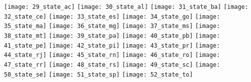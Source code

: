 \texttt{[image: 29\_state\_ac]}
\texttt{[image: 30\_state\_al]}
\texttt{[image: 31\_state\_ba]}
\texttt{[image: 32\_state\_ce]}
\texttt{[image: 33\_state\_es]}
\texttt{[image: 34\_state\_go]}
\texttt{[image: 35\_state\_ma]}
\texttt{[image: 36\_state\_mg]}
\texttt{[image: 37\_state\_ms]}
\texttt{[image: 38\_state\_mt]}
\texttt{[image: 39\_state\_pa]}
\texttt{[image: 40\_state\_pb]}
\texttt{[image: 41\_state\_pe]}
\texttt{[image: 42\_state\_pi]}
\texttt{[image: 43\_state\_pr]}
\texttt{[image: 44\_state\_rj]}
\texttt{[image: 45\_state\_rn]}
\texttt{[image: 46\_state\_ro]}
\texttt{[image: 47\_state\_rr]}
\texttt{[image: 48\_state\_rs]}
\texttt{[image: 49\_state\_sc]}
\texttt{[image: 50\_state\_se]}
\texttt{[image: 51\_state\_sp]}
\texttt{[image: 52\_state\_to]}


\label{ape:cap3_scatter_plot}
